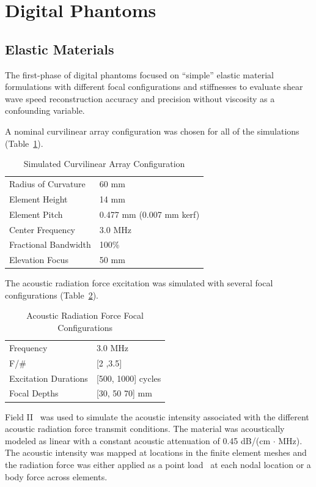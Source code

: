 \section{Digital Phantoms}\label{sect:digital_phantoms}

\subsection{Elastic Materials}
The first-phase of digital phantoms focused on ``simple'' elastic material
formulations with different focal configurations and stiffnesses to evaluate
shear wave speed reconstruction accuracy and precision without viscosity as a
confounding variable.

A nominal curvilinear array configuration was chosen for all of the simulations
(Table~\ref{table:curvilinear}).

\begin{table}[htb!]
    \centering
    \caption{Simulated Curvilinear Array Configuration}
    \begin{tabular}{|l|l|}
    \hline
    Radius of Curvature & 60 mm \\
    Element Height & 14 mm \\
    Element Pitch & 0.477 mm (0.007 mm kerf) \\
    Center Frequency & 3.0 MHz \\
    Fractional Bandwidth & 100\% \\
    Elevation Focus & 50 mm \\
    \hline
    \end{tabular}
\label{table:curvilinear}
\end{table}

The acoustic radiation force excitation was simulated with several focal
configurations (Table~\ref{table:arf}).

\begin{table}[htb!]
    \centering
    \caption{Acoustic Radiation Force Focal Configurations}
    \begin{tabular}{|l|l|}
    \hline
    Frequency & 3.0 MHz \\
    F/\# & [2 ,3.5] \\
    Excitation Durations & [500, 1000] cycles \\
    Focal Depths & [30, 50 70] mm \\
    \hline
    \end{tabular}
\label{table:arf}
\end{table}

Field II~\cite{Jensen1992} was used to simulate the acoustic intensity
associated with the different acoustic radiation force transmit conditions.
The material was acoustically modeled as linear with a constant acoustic
attenuation of 0.45 dB/(cm $\cdot$ MHz).  The acoustic intensity was mapped at
locations in the finite element meshes and the radiation force was either
applied as a point load~\cite{Palmeri2005} at each nodal location or a body
force across elements.

